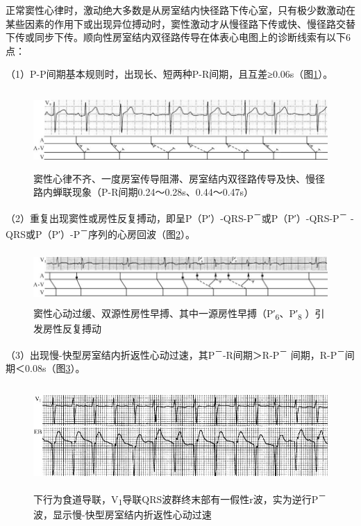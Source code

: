 正常窦性心律时，激动绝大多数是从房室结内快径路下传心室，只有极少数激动在某些因素的作用下或出现异位搏动时，窦性激动才从慢径路下传或快、慢径路交替下传或同步下传。顺向性房室结内双径路传导在体表心电图上的诊断线索有以下6点：

（1）P-P间期基本规则时，出现长、短两种P-R间期，且互差≥0.06s（图\ref{fig25-3}）。

\begin{figure}[!htbp]
 \centering
 \includegraphics[width=5.82292in,height=1.16667in]{./images/Image00414.jpg}
 \captionsetup{justification=centering}
 \caption{窦性心律不齐、一度房室传导阻滞、房室结内双径路传导及快、慢径路内蝉联现象（P-R间期0.24～0.28s、0.44～0.47s）}
 \label{fig25-3}
  \end{figure} 

（2）重复出现窦性或房性反复搏动，即呈P（P′）-QRS-P\textsuperscript{－}或P（P′）-QRS-P\textsuperscript{－} -QRS或P（P′）-P\textsuperscript{－}序列的心房回波（图\ref{fig25-4}）。

\begin{figure}[!htbp]
 \centering
 \includegraphics[width=5.82292in,height=0.79167in]{./images/Image00415.jpg}
 \captionsetup{justification=centering}
 \caption{窦性心动过缓、双源性房性早搏、其中一源房性早搏（P′\textsubscript{6}、P′\textsubscript{8} ）引发房性反复搏动}
 \label{fig25-4}
  \end{figure} 


（3）出现慢-快型房室结内折返性心动过速，其P\textsuperscript{－}-R间期＞R-P\textsuperscript{－} 间期，R-P\textsuperscript{－}间期＜0.08s（图\ref{fig25-5}）。

\begin{figure}[!htbp]
 \centering
 \includegraphics[width=5.5625in,height=1.53125in]{./images/Image00416.jpg}
 \captionsetup{justification=centering}
 \caption{下行为食道导联，V\textsubscript{1}导联QRS波群终末部有一假性r波，实为逆行P\textsuperscript{－}波，显示慢-快型房室结内折返性心动过速}
 \label{fig25-5}
  \end{figure} 


